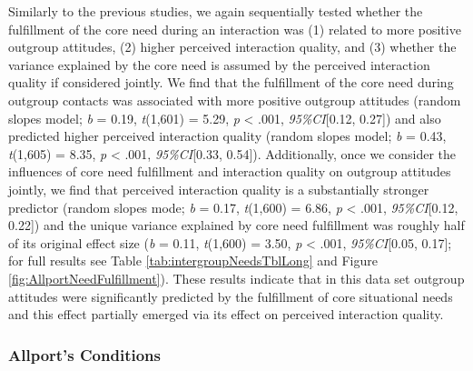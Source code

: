 Similarly to the previous studies, we again sequentially tested whether
the fulfillment of the core need during an interaction was (1) related
to more positive outgroup attitudes, (2) higher perceived interaction
quality, and (3) whether the variance explained by the core need is
assumed by the perceived interaction quality if considered jointly. We
find that the fulfillment of the core need during outgroup contacts was
associated with more positive outgroup attitudes (random slopes model;
\textit{b} = 0.19, \textit{t}(1,601) = 5.29, \textit{p} \textless{}
.001, \textit{95\%CI}{[}0.12, 0.27{]}) and also predicted higher
perceived interaction quality (random slopes model; \textit{b} = 0.43,
\textit{t}(1,605) = 8.35, \textit{p} \textless{} .001,
\textit{95\%CI}{[}0.33, 0.54{]}). Additionally, once we consider the
influences of core need fulfillment and interaction quality on outgroup
attitudes jointly, we find that perceived interaction quality is a
substantially stronger predictor (random slopes mode; \textit{b} = 0.17,
\textit{t}(1,600) = 6.86, \textit{p} \textless{} .001,
\textit{95\%CI}{[}0.12, 0.22{]}) and the unique variance explained by
core need fulfillment was roughly half of its original effect size
(\textit{b} = 0.11, \textit{t}(1,600) = 3.50, \textit{p} \textless{}
.001, \textit{95\%CI}{[}0.05, 0.17{]}; for full results see Table
\ref{tab:intergroupNeedsTblLong} and Figure
\ref{fig:AllportNeedFulfillment}). These results indicate that in this
data set outgroup attitudes were significantly predicted by the
fulfillment of core situational needs and this effect partially emerged
via its effect on perceived interaction quality.

\subsubsection{Allport's Conditions}

